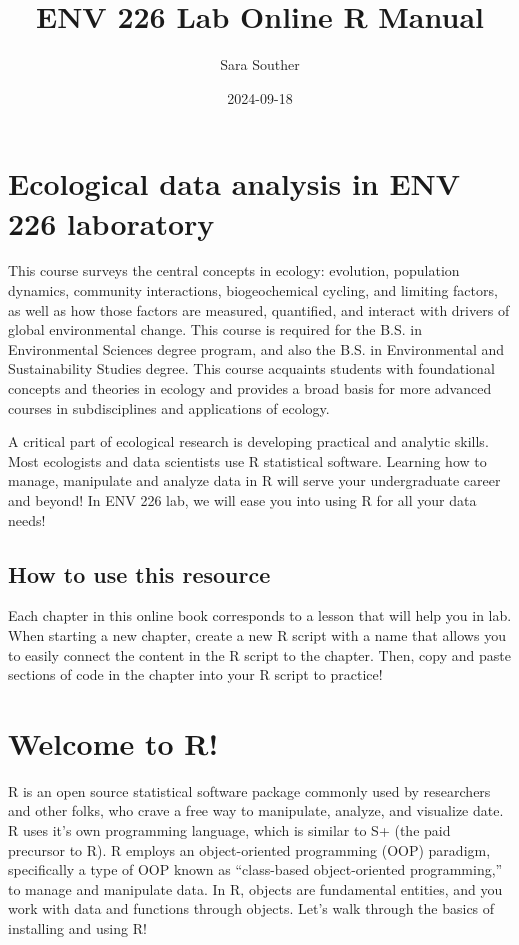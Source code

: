 \documentclass[
]{book}
\title{ENV 226 Lab Online R Manual}
\author{Sara Souther}
\date{2024-09-18}
\begin{document}
\maketitle

{
\setcounter{tocdepth}{1}
\tableofcontents
}
\hypertarget{ecological-data-analysis-in-env-226-laboratory}{%
\chapter{Ecological data analysis in ENV 226 laboratory}\label{ecological-data-analysis-in-env-226-laboratory}}

This course surveys the central concepts in ecology: evolution, population dynamics, community interactions, biogeochemical cycling, and limiting factors, as well as how those factors are measured, quantified, and interact with drivers of global environmental change. This course is required for the B.S. in Environmental Sciences degree program, and also the B.S. in Environmental and Sustainability Studies degree. This course acquaints students with foundational concepts and theories in ecology and provides a broad basis for more advanced courses in subdisciplines and applications of ecology.

A critical part of ecological research is developing practical and analytic skills. Most ecologists and data scientists use R statistical software. Learning how to manage, manipulate and analyze data in R will serve your undergraduate career and beyond! In ENV 226 lab, we will ease you into using R for all your data needs!

\hypertarget{how-to-use-this-resource}{%
\section{How to use this resource}\label{how-to-use-this-resource}}

Each chapter in this online book corresponds to a lesson that will help you in lab. When starting a new chapter, create a new R script with a name that allows you to easily connect the content in the R script to the chapter. Then, copy and paste sections of code in the chapter into your R script to practice!

\hypertarget{welcome-to-r}{%
\chapter{Welcome to R!}\label{welcome-to-r}}

R is an open source statistical software package commonly used by researchers and other folks, who crave a free way to manipulate, analyze, and visualize date. R uses it's own programming language, which is similar to S+ (the paid precursor to R). R employs an object-oriented programming (OOP) paradigm, specifically a type of OOP known as ``class-based object-oriented programming,'' to manage and manipulate data. In R, objects are fundamental entities, and you work with data and functions through objects. Let's walk through the basics of installing and using R!
\end{document}
